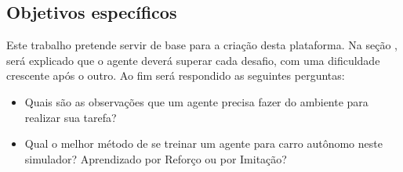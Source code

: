 \subsection*{Objetivos específicos}
Este trabalho pretende servir de base para a criação desta plataforma. Na seção , será explicado que o agente deverá superar cada desafio, com uma dificuldade crescente após o outro. Ao fim será respondido as seguintes perguntas:

\begin{itemize}
    \item Quais são as observações que um agente precisa fazer do ambiente para realizar sua tarefa?
    \item Qual o melhor método de se treinar um agente para carro autônomo neste simulador? Aprendizado por Reforço ou por Imitação?
\end{itemize}



